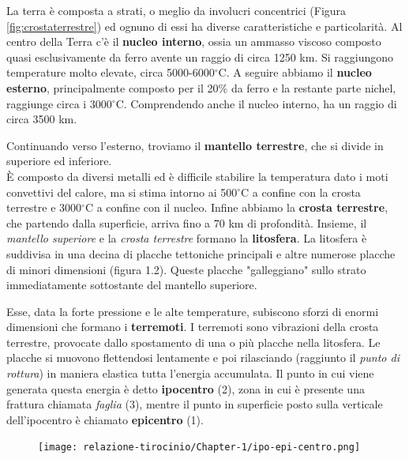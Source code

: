 \documentclass[a4paper,10pt]{memoir}
\begin{document}
La terra è composta a strati, o meglio da involucri concentrici (Figura \ref{fig:crostaterrestre}) ed ognuno di essi ha diverse caratteristiche e particolarità.
Al centro della Terra c'è il \textbf{nucleo interno}, ossia un ammasso viscoso composto quasi esclusivamente da ferro avente un raggio di circa 1250 km. Si raggiungono temperature molto elevate, circa 5000-6000$^{\circ}$C.
A seguire abbiamo il \textbf{nucleo esterno}, principalmente composto per il 20\% da ferro e la restante parte nichel, raggiunge circa i 3000$^{\circ}$C. Comprendendo anche il nucleo interno, ha un raggio di circa 3500 km.

Continuando verso l'esterno, troviamo il \textbf{mantello terrestre}, che si divide in superiore ed inferiore.
\\
È composto da diversi metalli ed è difficile stabilire la temperatura dato i moti convettivi del calore, ma si stima intorno ai 500$^{\circ}$C a confine con la crosta terrestre e 3000$^{\circ}$C a confine con il nucleo.
Infine abbiamo la \textbf{crosta terrestre}, che partendo dalla superficie, arriva fino a 70 km di profondità.
Insieme, il \textit{mantello superiore} e la \textit{crosta terrestre} formano la \textbf{litosfera}.
La litosfera è suddivisa in una decina di placche tettoniche principali e altre numerose placche di minori dimensioni (figura 1.2). Queste placche "galleggiano" sullo strato immediatamente sottostante del mantello superiore.\cite{terra}

Esse, data la forte pressione e le alte temperature, subiscono sforzi di enormi dimensioni che formano i \textbf{terremoti}.
I terremoti sono vibrazioni della crosta terrestre, provocate dallo spostamento  di una o più placche nella litosfera.
Le placche si muovono flettendosi lentamente e poi rilasciando (raggiunto il \textit{punto di rottura}) in maniera elastica tutta l'energia accumulata.
Il punto in cui viene generata questa energia è detto \textbf{ipocentro} (2), zona in cui è presente una frattura chiamata \textit{faglia} (3), mentre il punto in superficie posto sulla verticale dell'ipocentro è chiamato \textbf{epicentro} (1).
\begin{figure}[ht]
\label{fig:ipocentro}
\centering
\texttt{[image: relazione-tirocinio/Chapter-1/ipo-epi-centro.png]}
\end{figure}

\clearpage
\end{document}
